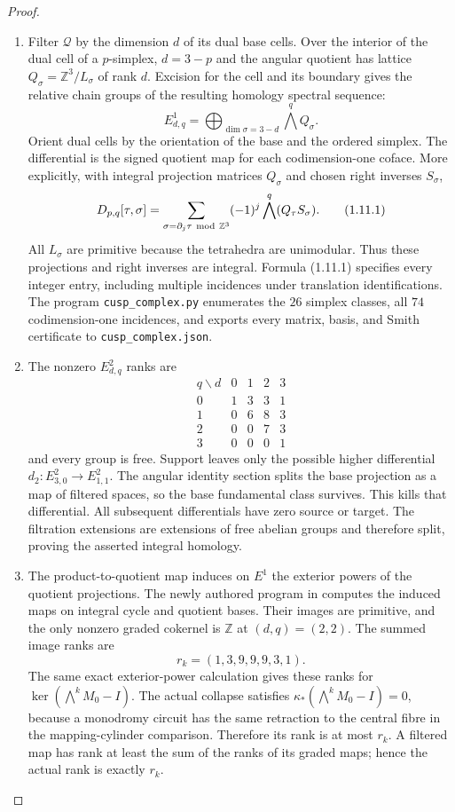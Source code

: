 \documentclass[11pt,a4paper]{article}
\theoremstyle{definition}
\begin{document}
\begin{proof}
\begin{enumerate}[label=\arabic*.]
\item Filter $\mathcal Q$ by the dimension $d$ of its dual base cells.
Over the interior of the dual cell of a $p$-simplex, $d=3-p$ and the
angular quotient has lattice
$Q_\sigma=\mathbb Z^3/L_\sigma$ of rank $d$.
Excision for the cell and its boundary gives the relative chain
groups of the resulting homology spectral sequence:
\[
E^1_{d,q}=\bigoplus_{\dim\sigma=3-d}\bigwedge^qQ_\sigma.
\]
Orient dual cells by the orientation of the base and the ordered
simplex.  The differential is the signed quotient map for each
codimension-one coface.  More explicitly, with integral projection
matrices $Q_\sigma$ and chosen right inverses $S_\sigma$,
\[
D_{p,q}[\tau,\sigma]=
 \sum_{\sigma=\partial_j\tau\ {\rm mod}\ \mathbb Z^3}
 (-1)^j\bigwedge^q(Q_\tau S_\sigma).
\tag{1.11.1}
\]
All $L_\sigma$ are primitive because the tetrahedra are unimodular.
Thus these projections and right inverses are integral.  Formula
(1.11.1) specifies every integer entry, including multiple incidences
under translation identifications.  The program
\texttt{cusp\_complex.py} enumerates the $26$ simplex classes, all
$74$ codimension-one incidences, and exports every matrix, basis, and
Smith certificate to \texttt{cusp\_complex.json}.

\item The nonzero $E^2_{d,q}$ ranks are
\[
\begin{array}{c|rrrr}
q\backslash d&0&1&2&3\\\hline
0&1&3&3&1\\
1&0&6&8&3\\
2&0&0&7&3\\
3&0&0&0&1
\end{array}
\]
and every group is free.  Support leaves only the possible higher
differential $d_2:E^2_{3,0}\to E^2_{1,1}$.
The angular identity section splits the base projection as a map of
filtered spaces, so the base fundamental class survives.  This kills
that differential.  All subsequent differentials have zero source or
target.  The filtration extensions are extensions of free abelian
groups and therefore split, proving the asserted integral homology.

\item The product-to-quotient map induces on $E^1$ the exterior powers of
the quotient projections.  The newly authored program
 in 
computes the induced maps on integral cycle and quotient bases.
Their images are primitive, and the only nonzero graded cokernel
is $\mathbb Z$ at $(d,q)=(2,2)$.  The summed image ranks are
\[
             r_k=(1,3,9,9,9,3,1).
\]
The same exact exterior-power calculation gives these ranks for
$\ker(\bigwedge^kM_0-I)$.
The actual collapse satisfies
$\kappa_*(\bigwedge^kM_0-I)=0$, because a monodromy circuit
has the same retraction to the central fibre in the mapping-cylinder
comparison.  Therefore its rank is at most $r_k$.
A filtered map has rank at least the sum of the ranks of its
graded maps; hence the actual rank is exactly $r_k$.


\end{enumerate}
\end{proof}
\end{document}
